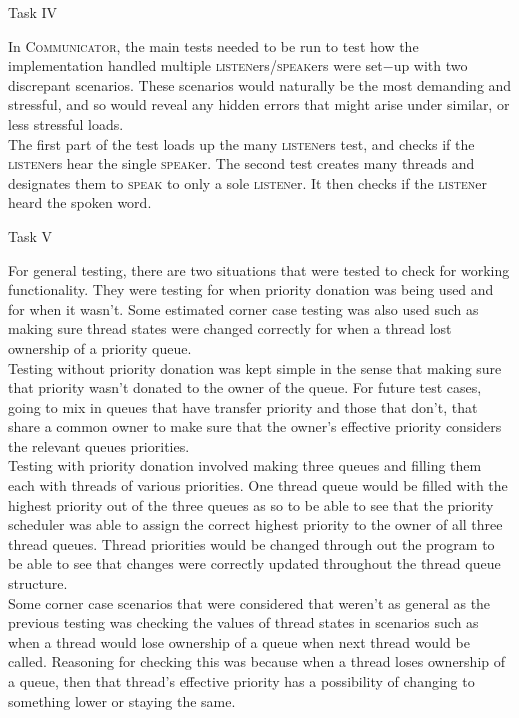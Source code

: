 \documentclass[12pt]{article}
\begin{document}
{\begin{center}Task IV\end{center}
In \textsc{Communicator}, the main tests needed to be run to test how the implementation handled multiple \textsc{listen}ers/\textsc{speak}ers were set$-$up with two discrepant scenarios. These scenarios would naturally be the most demanding and stressful, and so would reveal any hidden errors that might arise under similar, or less stressful loads.\\
The first part of the test loads up the many \textsc{listen}ers test, and checks if the \textsc{listen}ers hear the single \textsc{speak}er. The second test creates many threads and designates them to \textsc{speak} to only a sole \textsc{listen}er. It then checks if the \textsc{listen}er heard the spoken word.
\begin{center}Task V\end{center}
For general testing, there are two situations that were tested to check for working functionality. They were testing for when priority donation was being used and for when it wasn’t. Some estimated corner case testing was also used such as making sure thread states were changed correctly for when a thread lost ownership of a priority queue. \\ Testing without priority donation was kept simple in the sense that making sure that priority wasn’t donated to the owner of the queue. For future test cases, going to mix in queues that have transfer priority and those that don’t, that share a common owner to make sure that the owner’s effective priority considers the relevant queues priorities. \\Testing with priority donation involved making three queues and filling them each with threads of various priorities. One thread queue would be filled with the highest priority out of the three queues as so to be able to see that the priority scheduler was able to assign the correct highest priority to the owner of all three thread queues. Thread priorities would be changed through out the program to be able to see that changes were correctly updated throughout the thread queue structure. \\	Some corner case scenarios that were considered that weren’t as general as the previous testing was checking the values of thread states in scenarios such as when a thread would lose ownership of a queue when next thread would be called. Reasoning for checking this was because when a thread loses ownership of a queue, then that thread’s effective priority has a possibility of changing to something lower or staying the same. 
}
\end{document}
